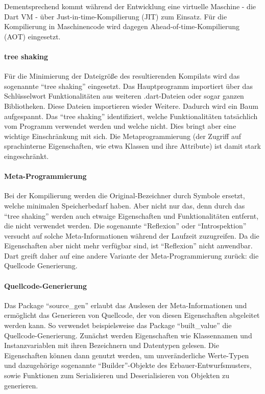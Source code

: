 Dementsprechend kommt während der Entwicklung eine virtuelle Maschine - die Dart VM - über Just-in-time-Kompilierung (JIT) zum Einsatz.
Für die Kompilierung in Maschinencode wird dagegen Ahead-of-time-Kompilierung (AOT) eingesetzt.

\paragraph{tree shaking}
Für die Minimierung der Dateigröße des resultierenden Kompilats wird das sogenannte \enquote{tree shaking} eingesetzt.
Das Hauptprogramm importiert über das Schlüsselwort  Funktionalitäten aus  weiteren .dart-Dateien oder sogar ganzen Bibliotheken.
Diese Dateien importieren wieder Weitere.
Dadurch wird ein Baum aufgespannt.
Das \enquote{tree shaking} identifiziert, welche Funktionalitäten tatsächlich vom Programm verwendet werden und welche nicht.
Dies bringt aber eine wichtige Einschränkung mit sich.
Die Metaprogrammierung (der Zugriff auf sprachinterne Eigenschaften, wie etwa Klassen und ihre Attribute) ist damit stark eingeschränkt.

\paragraph{Meta-Programmierung}
Bei der Kompilierung werden die Original-Bezeichner durch Symbole ersetzt, welche minimalen Speicherbedarf haben.
Aber nicht nur das, denn durch das \enquote{tree shaking} werden auch etwaige Eigenschaften und Funktionalitäten entfernt, die nicht verwendet werden.
Die sogenannte \enquote{Reflexion} oder \enquote{Introspektion} versucht auf solche Meta-Informationen während der Laufzeit zuzugreifen.
Da die Eigenschaften aber nicht mehr verfügbar sind, ist \enquote{Reflexion} nicht anwendbar.
Dart greift daher auf eine andere Variante der Meta-Programmierung zurück: die Quellcode Generierung.

\paragraph{Quellcode-Generierung}
Das Package \enquote{source_gen} erlaubt das Auslesen der Meta-Informationen und ermöglicht das Generieren von Quellcode, der von diesen Eigenschaften abgeleitet werden kann.
So verwendet beispielsweise das Package \enquote{built_value} die Quellcode-Generierung.
Zunächst werden Eigenschaften wie Klassennamen und Instanzvariablen mit ihren Bezeichnern und Datentypen gelesen.
Die Eigenschaften können dann genutzt werden, um unveränderliche Werte-Typen und dazugehörige sogenannte \enquote{Builder}-Objekte des Erbauer-Entwurfsmusters, sowie Funktionen zum Serialisieren und Deserialisieren von Objekten zu generieren.


